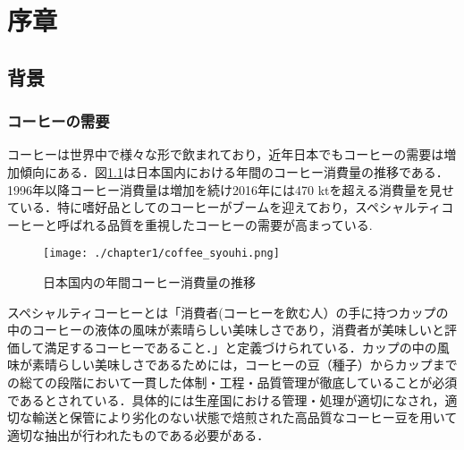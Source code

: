 
\chapter{序章}

\setcounter{page}{1}

\section{背景}

\subsection{コーヒーの需要}
コーヒーは世界中で様々な形で飲まれており，近年日本でもコーヒーの需要は増加傾向にある．図\ref{fig_syouhi}は日本国内における年間のコーヒー消費量の推移である．1996年以降コーヒー消費量は増加を続け2016年には470 ktを超える消費量を見せている．特に嗜好品としてのコーヒーがブームを迎えており，スペシャルティコーヒーと呼ばれる品質を重視したコーヒーの需要が高まっている.
\begin{figure}[h]
  \begin{center}
    \texttt{[image: ./chapter1/coffee\_syouhi.png]}
    \caption{日本国内の年間コーヒー消費量の推移}
    \label{fig_syouhi}
  \end{center}
\end{figure}

スペシャルティコーヒーとは「消費者(コーヒーを飲む人）の手に持つカップの中のコーヒーの液体の風味が素晴らしい美味しさであり，消費者が美味しいと評価して満足するコーヒーであること．」と定義づけられている．カップの中の風味が素晴らしい美味しさであるためには，コーヒーの豆（種子）からカップまでの総ての段階において一貫した体制・工程・品質管理が徹底していることが必須であるとされている．具体的には生産国における管理・処理が適切になされ，適切な輸送と保管により劣化のない状態で焙煎された高品質なコーヒー豆を用いて適切な抽出が行われたものである必要がある\cite{horiguchi}．

